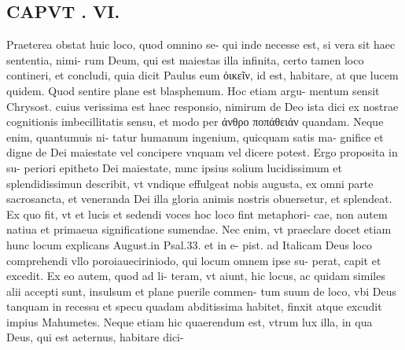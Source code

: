 \documentclass{article}
\begin{document}
\begin{pages}
\section*{CAPVT . VI. }
\marginpar{[ p.487 ]}\pstart Praeterea obstat huic loco, quod omnino se- qui inde necesse est, si vera sit haec sententia, nimi- rum Deum, qui est maiestas illa infinita, certo tamen loco contineri, et concludi, quia dicit Paulus eum ὀικεῖν, id est, habitare, at que lucem quidem. Quod sentire plane est blasphemum. Hoc etiam argu- mentum sensit Chrysost. cuius verissima est haec responsio, nimirum de Deo ista dici ex nostrae cognitionis imbecillitatis sensu, et modo per ἀνθρο ποπάθειάν quandam. Neque enim, quantumuis ni- tatur humanum ingenium, quicquam satis ma- gnifice et digne de Dei maiestate vel concipere vnquam vel dicere potest. Ergo proposita in su- periori epitheto Dei maiestate, nunc ipsius solium lucidissimum et splendidissimun describit, vt vndique effulgeat nobis augusta, ex omni parte sacrosancta, et veneranda Dei illa gloria animis nostris obuersetur, et splendeat. Ex quo fit, vt et lucis et sedendi voces hoc loco fint metaphori- cae, non autem natiua et primaeua significatione sumendae. Nec enim, vt praeclare docet etiam hunc locum explicans August.in Psal.33. et in e- pist. ad Italicam Deus loco comprehendi vllo poroiaueciriniodo, qui locum omnem ipse su- perat, capit et excedit. Ex eo autem, quod ad li- teram, vt aiunt, hic locus, ac quidam similes alii accepti sunt, insulsum et plane puerile commen- tum suum de loco, vbi Deus tanquam in recessu et specu quadam abditissima habitet, finxit atque  excudit impius Mahumetes.  \pend\pstart Neque etiam hic quaerendum est, vtrum lux illa, in qua Deus, qui est aeternus, habitare dici-  \pend

\end{pages}
\end{document}
